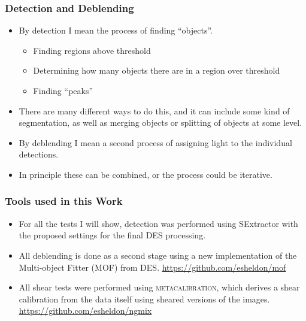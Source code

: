 \documentclass{beamer}
\newcommand{\mcal}{\textsc{metacalibration}}
\begin{document}
\frame
{
    \frametitle{Detection and Deblending}

 
    \begin{itemize}

        \item By detection I mean the process of finding ``objects''.
            \begin{itemize}
                \item Finding regions above threshold
                \item Determining how many objects there are in a region over threshold
                \item Finding ``peaks''
            \end{itemize}

        \item There are many different ways to do this, and it can include some
            kind of segmentation, as well as merging objects or splitting of
            objects at some level.

        \item By deblending I mean a second process of assigning light to the
            individual detections.

        \item In principle these can be combined, or the process could be iterative.

    \end{itemize}

}

\frame
{
    \frametitle{Tools used in this Work}

 
    \begin{itemize}

        \item For all the tests I will show, detection was performed using SExtractor
            with the proposed settings for the final DES processing.

        \item All deblending is done as a second stage using a new implementation
            of the Multi-object Fitter (MOF) from DES. \url{https://github.com/esheldon/mof}

        \item All shear tests were performed using \mcal, which derives a shear
            calibration from the data itself using sheared versions of the images.
            \url{https://github.com/esheldon/ngmix}


    \end{itemize}

}
\end{document}
